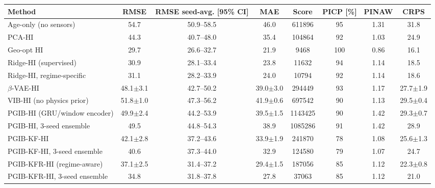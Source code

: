 \setlength{\tabcolsep}{4pt}\begin{tabular}{l c c c c c c c}
\hline
 Method & RMSE & RMSE seed-avg. [95\% CI] & MAE & Score & PICP [\%] & PINAW & CRPS \\
\hline
Age-only (no sensors) & 54.7 & 50.9--58.5 & 46.0 & 611896 & 95 & 1.31 & 31.8 \\
PCA-HI & 44.3 & 40.7--48.0 & 35.4 & 104864 & 92 & 1.03 & 24.9 \\
Geo-opt HI & 29.7 & 26.6--32.7 & 21.9 & 9468 & 100 & 0.86 & 16.1 \\
Ridge-HI (supervised) & 30.9 & 28.1--33.4 & 23.8 & 11632 & 94 & 1.14 & 18.5 \\
Ridge-HI, regime-specific & 31.1 & 28.2--33.9 & 24.0 & 10794 & 92 & 1.14 & 18.6 \\
$\beta$-VAE-HI & 48.1$\pm$3.1 & 42.7--50.2 & 39.0$\pm$3.0 & 294449 & 93 & 1.17 & 27.7$\pm$1.9 \\
VIB-HI (no physics prior) & 51.8$\pm$1.0 & 47.3--56.2 & 41.9$\pm$0.6 & 697542 & 90 & 1.13 & 29.5$\pm$0.4 \\
PGIB-HI (GRU/window encoder) & 49.9$\pm$2.4 & 44.2--53.9 & 39.5$\pm$1.5 & 1143425 & 90 & 1.42 & 29.3$\pm$0.7 \\
PGIB-HI, 3-seed ensemble & 49.5 & 44.8--54.3 & 38.9 & 1085286 & 91 & 1.42 & 28.9 \\
PGIB-KF-HI & 42.1$\pm$2.8 & 37.2--43.6 & 33.9$\pm$1.9 & 241870 & 78 & 1.08 & 25.6$\pm$1.3 \\
PGIB-KF-HI, 3-seed ensemble & 40.6 & 37.3--44.0 & 32.9 & 124580 & 79 & 1.07 & 24.7 \\
PGIB-KFR-HI (regime-aware) & 37.1$\pm$2.5 & 31.4--37.2 & 29.4$\pm$1.5 & 187056 & 85 & 1.12 & 22.3$\pm$0.8 \\
PGIB-KFR-HI, 3-seed ensemble & 34.8 & 31.8--37.8 & 27.8 & 37063 & 85 & 1.12 & 21.0 \\
\hline
\end{tabular}
